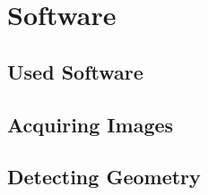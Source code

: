 \section{Software}
\label{sec:sw}
\subsection{Used Software}
\subsection{Acquiring Images}
\subsection{Detecting Geometry}
